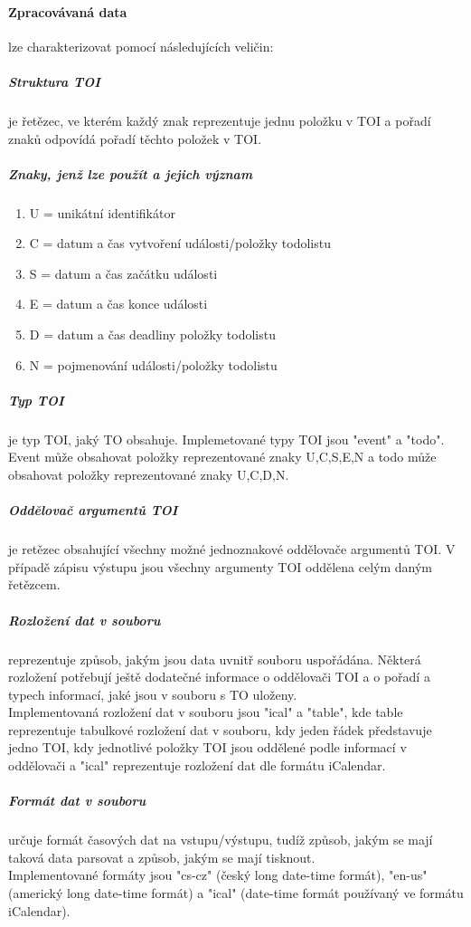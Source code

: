 \documentclass[11pt]{article}
\begin{document}
\paragraph{Zpracovávaná data} lze charakterizovat pomocí následujících veličin:
\subparagraph{Struktura TOI} je řetězec, ve kterém každý znak reprezentuje jednu položku v TOI a pořadí znaků odpovídá pořadí těchto položek v TOI.
\subparagraph{Znaky, jenž lze použít a jejich význam}
\begin{enumerate}[leftmargin=5mm]
\item U = unikátní identifikátor
\item C = datum a čas vytvoření události/položky todolistu
\item S = datum a čas začátku události
\item E = datum a čas konce události
\item D = datum a čas deadliny položky todolistu
\item N = pojmenování události/položky todolistu
\end{enumerate}
\subparagraph{Typ TOI} je typ TOI, jaký TO obsahuje. Implemetované typy TOI jsou "event" a "todo". Event může obsahovat položky reprezentované znaky U,C,S,E,N a todo může obsahovat položky reprezentované znaky U,C,D,N.
\subparagraph{Oddělovač argumentů TOI} je retězec obsahující všechny možné jednoznakové oddělovače argumentů TOI. V případě zápisu výstupu 
jsou všechny argumenty TOI oddělena celým daným řetězcem.
\subparagraph{Rozložení dat v souboru} reprezentuje způsob, jakým jsou data uvnitř souboru uspořádána. Některá rozložení potřebují ještě dodatečné informace o oddělovači TOI a o pořadí a typech informací, jaké jsou v souboru s TO uloženy.\\
Implementovaná rozložení dat v souboru jsou "ical" a "table", kde table reprezentuje tabulkové rozložení dat v souboru, kdy jeden řádek představuje jedno TOI, kdy jednotlivé položky TOI jsou oddělené podle informací v oddělovači a "ical" reprezentuje rozložení dat dle formátu iCalendar.
\subparagraph{Formát dat v souboru} určuje formát časových dat na vstupu/výstupu, tudíž způsob, jakým se mají taková data parsovat a způsob, jakým se mají tisknout.\\
Implementované formáty jsou "cs-cz" (český long date-time formát), "en-us" (americký long date-time formát) a "ical" (date-time formát používaný ve formátu iCalendar).
\end{document}
